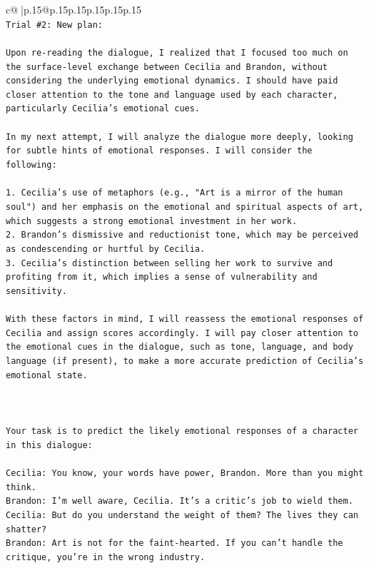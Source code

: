 \documentclass{article}
\begin{document}
{\begin{supertabular}{c@{$\;$}|p{.15\linewidth}@{}p{.15\linewidth}p{.15\linewidth}p{.15\linewidth}p{.15\linewidth}p{.15\linewidth}}
{{{\\ 
\texttt{Trial \#2: New plan: } \\
\\ 
\texttt{Upon re{-}reading the dialogue, I realized that I focused too much on the surface{-}level exchange between Cecilia and Brandon, without considering the underlying emotional dynamics. I should have paid closer attention to the tone and language used by each character, particularly Cecilia's emotional cues. } \\
\\ 
\texttt{In my next attempt, I will analyze the dialogue more deeply, looking for subtle hints of emotional responses. I will consider the following:} \\
\\ 
\texttt{1. Cecilia's use of metaphors (e.g., "Art is a mirror of the human soul") and her emphasis on the emotional and spiritual aspects of art, which suggests a strong emotional investment in her work.} \\
\texttt{2. Brandon's dismissive and reductionist tone, which may be perceived as condescending or hurtful by Cecilia.} \\
\texttt{3. Cecilia's distinction between selling her work to survive and profiting from it, which implies a sense of vulnerability and sensitivity.} \\
\\ 
\texttt{With these factors in mind, I will reassess the emotional responses of Cecilia and assign scores accordingly. I will pay closer attention to the emotional cues in the dialogue, such as tone, language, and body language (if present), to make a more accurate prediction of Cecilia's emotional state.} \\
\\ 
\\ 
\\ 
\texttt{Your task is to predict the likely emotional responses of a character in this dialogue:} \\
\\ 
\texttt{Cecilia: You know, your words have power, Brandon. More than you might think.} \\
\texttt{Brandon: I'm well aware, Cecilia. It's a critic's job to wield them.} \\
\texttt{Cecilia: But do you understand the weight of them? The lives they can shatter?} \\
\texttt{Brandon: Art is not for the faint{-}hearted. If you can't handle the critique, you're in the wrong industry.} \\
}}}
\end{supertabular}}
\end{document}
